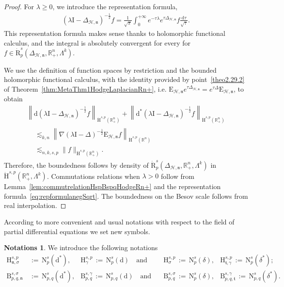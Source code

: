 \documentclass[10pt]{amsart}
\theoremstyle{definition}\newtheorem{defi}[theo]{Definition}\newtheorem{rema}[theo]{Remark}\newtheorem{exam}[theo]{Example}\newtheorem{exem}[theo]{Example}\newtheorem{nota}[theo]{Notation}
\newcommand{\bbR}{\mathbb{R}}
\newcommand{\rmH}{\mathrm{H}}%
\newcommand{\rmB}{\mathrm{B}}
\newcommand{\rmd}{\mathrm{d}}
\newcommand{\rmR}{\mathrm{R}}
\newcommand{\rmE}{\mathrm{E}}
\newcommand{\rmN}{\mathrm{N}}
\newcommand{\rmI}{\mathrm{I}}
\newcommand{\clH}{\mathcal{H}}
\newcommand{\fkn}{\mathfrak{n}}
\newcommand{\fkt}{\mathfrak{t}}
\newtheorem{notas}[theo]{Notations}
\begin{document}
\begin{proof}
For $\lambda\geqslant 0$, we introduce the representation formula,
\begin{align}\label{eq:repformulanegSqrt}
(\lambda \rmI -\Delta_{\clH,\fkn})^{-\frac{1}{2}} f = \frac{1}{\sqrt{\pi}}\int_{0}^{+\infty} e^{-\tau\lambda}e^{\tau\Delta_{\clH,\fkn}}f \frac{\rmd\tau}{\sqrt{\tau}} .
\end{align}
This representation formula makes sense thanks to holomorphic functional calculus, and the integral is absolutely convergent for every for $f\in \dot{\rmR}^s_{p}(\Delta_{\clH,\fkn},\bbR^n_+,\Lambda^k)$.

We use the definition of function spaces by restriction and the bounded holomorphic functional calculus, with the identity provided by point~\eqref{theo2.29.2} of Theorem~\ref{thm:MetaThm1HodgeLaplacianRn+}, i.e. $\rmE _{\clH,\fkn}e^{\tau\Delta_{\clH,\fkn}} = e^{\tau\Delta}\rmE_{\clH,\fkn}$, to obtain
\begin{multline*}
\left\| \rmd\left(\lambda \rmI -\Delta_{\clH,\fkn}\right)^{-\frac{1}{2}} f\right\|_{\dot{\rmH}^{s,p}\left(\bbR^{n}_+\right)} + \left\| \rmd^\ast\left(\lambda \rmI -\Delta_{\clH,\fkn}\right)^{-\frac{1}{2}} f\right\|_{\dot{\rmH}^{s,p}\left(\bbR^{n}_+\right)}\\
\begin{aligned}
&\lesssim_{k,n} \left\| \nabla (\lambda \rmI -\Delta)^{-\frac{1}{2}} \rmE _{\clH,\fkn} f\right\|_{\dot{\rmH}^{s,p}\left(\bbR^{n}\right)}
\\
&\lesssim_{n,k,s,p} \| f\|_{\dot{\rmH}^{s,p}\left(\bbR^{n}_+\right)}.
\end{aligned}
\end{multline*}
Therefore, the boundedness follows by density of $\dot{\rmR}^s_{p}(\Delta_{\clH,\fkn},\bbR^n_+,\Lambda^k)$ in $\dot{\rmH}^{s,p}(\bbR^n_+,\Lambda^k)$. Commutations relations when $\lambda>0$ follow from Lemma~\ref{lem:commutrelationHspBspqHodgeRn+} and the representation formula~\eqref{eq:repformulanegSqrt}. The boundedness on the Besov scale follows from real interpolation.
\end{proof}


According to more convenient and usual notations with respect to the field of partial differential equations we set new symbols.

\begin{notas}\label{def:newNotationsSoleinodalSpaces}
We introduce the following notations
\begin{align*}
{\rmH}^{s,p}_{{\fkn},\sigma}\, &{:=}\,{\rmN}^{s}_{p}\left(\rmd^\ast\right),  &{\rmH}^{s,p}_{\gamma}\,{:=}\,{\rmN}^{s}_{p}(\rmd) \quad\text{and}\quad &{\rmH}^{s,p}_{\sigma}\,{:=}\,{\rmN}^{s}_{p}(\delta),  &{\rmH}^{s,p}_{{\fkt},\gamma}\,{:=}\,{\rmN}^{s}_{p}\left(\delta^\ast\right);\\
{\rmB}^{s,\sigma}_{p,q,{\fkn}}\,&{:=}\,{\rmN}^{s}_{p,q}(\rmd^\ast), &{\rmB}^{s,\gamma}_{p,q} \,{:=}\,{\rmN }^{s}_{p,q}(\rmd) \quad\text{and}\quad &{\rmB}^{s,\sigma}_{p,q}\,{:=}\,{\rmN}^{s}_{p}(\delta), &{\rmB}^{s,\gamma}_{p,q,{\fkt}} \,{:=}\,{\rmN}^{s}_{p,q}\left(\delta^\ast\right).
\end{align*}
\end{notas}
\end{document}
